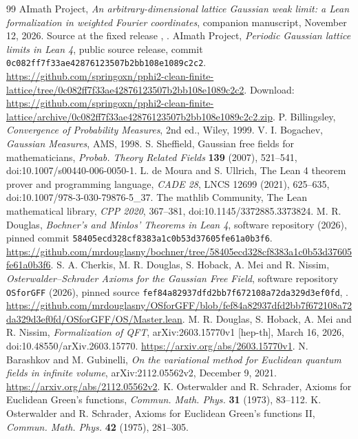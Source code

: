 \documentclass[11pt]{amsart}
\theoremstyle{remark}\newtheorem{remark}[theorem]{Remark}
\begin{document}
\begin{thebibliography}{99}
 AImath Project, \emph{An arbitrary-dimensional lattice Gaussian weak limit: a Lean formalization in weighted Fourier coordinates}, companion manuscript, November 12, 2026. Source at the fixed release \cite{Release}, .
 AImath Project, \emph{Periodic Gaussian lattice limits in Lean 4}, public source release, commit \texttt{0c082ff7f33ae42876123507b2bb108e1089c2c2}. \url{https://github.com/springoxn/pphi2-clean-finite-lattice/tree/0c082ff7f33ae42876123507b2bb108e1089c2c2}. Download: \url{https://github.com/springoxn/pphi2-clean-finite-lattice/archive/0c082ff7f33ae42876123507b2bb108e1089c2c2.zip}.
 P. Billingsley, \emph{Convergence of Probability Measures}, 2nd ed., Wiley, 1999.
 V. I. Bogachev, \emph{Gaussian Measures}, AMS, 1998.
 S. Sheffield, Gaussian free fields for mathematicians, \emph{Probab. Theory Related Fields} \textbf{139} (2007), 521--541, doi:10.1007/s00440-006-0050-1.
 L. de Moura and S. Ullrich, The Lean 4 theorem prover and programming language, \emph{CADE 28}, LNCS 12699 (2021), 625--635, doi:10.1007/978-3-030-79876-5\_37.
 The mathlib Community, The Lean mathematical library, \emph{CPP 2020}, 367--381, doi:10.1145/3372885.3373824.
 M. R. Douglas, \emph{Bochner's and Minlos' Theorems in Lean 4}, software repository (2026), pinned commit \texttt{58405ecd328cf8383a1c0b53d37605fe61a0b3f6}. \url{https://github.com/mrdouglasny/bochner/tree/58405ecd328cf8383a1c0b53d37605fe61a0b3f6}.
 S. A. Cherkis, M. R. Douglas, S. Hoback, A. Mei and R. Nissim, \emph{Osterwalder--Schrader Axioms for the Gaussian Free Field}, software repository \texttt{OSforGFF} (2026), pinned source \texttt{fef84a82937dfd2bb7f672108a72da329d3ef0fd}, . \url{https://github.com/mrdouglasny/OSforGFF/blob/fef84a82937dfd2bb7f672108a72da329d3ef0fd/OSforGFF/OS/Master.lean}.
 M. R. Douglas, S. Hoback, A. Mei and R. Nissim, \emph{Formalization of QFT}, arXiv:2603.15770v1 [hep-th], March 16, 2026, doi:10.48550/arXiv.2603.15770. \url{https://arxiv.org/abs/2603.15770v1}.
 N. Barashkov and M. Gubinelli, \emph{On the variational method for Euclidean quantum fields in infinite volume}, arXiv:2112.05562v2, December 9, 2021. \url{https://arxiv.org/abs/2112.05562v2}.
 K. Osterwalder and R. Schrader, Axioms for Euclidean Green's functions, \emph{Commun. Math. Phys.} \textbf{31} (1973), 83--112.
 K. Osterwalder and R. Schrader, Axioms for Euclidean Green's functions II, \emph{Commun. Math. Phys.} \textbf{42} (1975), 281--305.
\end{thebibliography}
\end{document}
